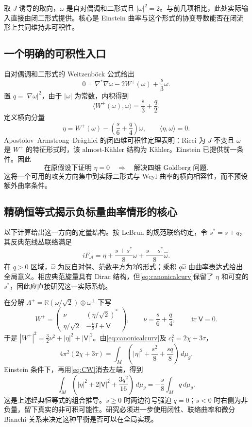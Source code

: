 \documentclass[11pt,a4paper]{article}
\newcommand{\tr}{\operatorname{tr}}
\newcommand{\dd}{\,d\mu_g}
\newcommand{\Ka}{K{\latin\"a}hler}
\theoremstyle{definition}
\numberwithin{equation}{section}
\begin{document}
取 $J$ 诱导的取向，$\omega$ 是自对偶调和二形式且 $|\omega|^2=2$。与前几项相比，此处实际输入直接由闭二形式提供。核心是 Einstein 曲率与这个形式的协变导数能否在闭流形上共同维持非可积性。

\subsection{一个明确的可积性入口}
自对偶调和二形式的 {\latin Weitzenb\"ock} 公式给出
\[
0=\nabla^*\nabla\omega-2W^+(\omega)+\frac{s}{3}\omega.
\]
置 $q=|\nabla\omega|^2$，由于 $|\omega|$ 为常数，内积得到
\[
\langle W^+(\omega),\omega\rangle=\frac{s}{3}+\frac q2.
\]
定义横向分量
\begin{equation}
\eta=W^+(\omega)-\left(\frac{s}{6}+\frac q4\right)\omega,
\qquad\langle\eta,\omega\rangle=0.\label{eq:eta}
\end{equation}
Apostolov--Armstrong--Dr{\latin\u a}ghici 的闭四维可积性定理表明：Ricci 为 $J$-不变且 $\omega$ 是 $W^+$ 的特征形式时，该 almost-\Ka{} 结构为 \Ka{}\cite{AAD}。Einstein 已提供前一条件。因此
\begin{equation}
\boxed{\text{在原假设下证明 }\eta=0
\quad\Longrightarrow\quad\text{解决四维 Goldberg 问题}.}\label{eq:Goldbridge}
\end{equation}
这将一个可用的攻关方向集中到实际二形式与 Weyl 曲率的横向相容性，而不预设额外曲率条件。

\subsection{精确恒等式揭示负标量曲率情形的核心}
以下计算给出这一方向的定量结构。按 LeBrun 的规范联络约定\cite{LeBrun2005}，令 $s^*=s+q$，其反典范线丛联络满足
\begin{equation}
iF_{\mathcal A}=\eta+\frac{s+s^*}{8}\omega+
\frac{s-s^*}{8}\widehat\omega.\label{eq:canonicalcurv}
\end{equation}
在 $q>0$ 区域，$\widehat\omega$ 为反自对偶、范数平方为2的形式；乘积 $q\widehat\omega$ 由曲率表达式给出全局意义。相应典范旋量具有 Dirac 结构，但\eqref{eq:canonicalcurv}保留了 $\eta$ 和可变的 $s^*$，因此应直接研究这一实际系统。

在分解 $\Lambda^+=\mathbb R(\omega/\sqrt2)\oplus\omega^\perp$ 下写
\[
W^+=\begin{pmatrix}
\nu&(\eta/\sqrt2)^*\\
\eta/\sqrt2&-\frac\nu2I+\mathsf V
\end{pmatrix},\qquad
\nu=\frac s6+\frac q4,\qquad\tr\mathsf V=0.
\]
于是 $|W^+|^2=\tfrac32\nu^2+|\eta|^2+|\mathsf V|^2$。由\eqref{eq:canonicalcurv}及 $c_1^2=2\chi+3\tau$，
\[
4\pi^2(2\chi+3\tau)
=\int_M\left(|\eta|^2+\frac{s^2}{8}+\frac{sq}{8}\right)\dd.
\]
Einstein 条件下，再用\eqref{eq:CW}消去左端，得到
\begin{equation}
\boxed{
\int_M\left(|\eta|^2+2|\mathsf V|^2+\frac{3q^2}{16}\right)\dd
=-\frac{s}{8}\int_Mq\dd.}\label{eq:AKbalance}
\end{equation}
这是上述经典恒等式的组合推导。$s\ge0$ 时两边符号强迫 $q=0$；$s<0$ 时右侧为非负量，留下真实的非可积可能性。研究必须进一步使用闭性、联络曲率和微分 Bianchi 关系来决定这种平衡是否可以在全局实现。
\end{document}
